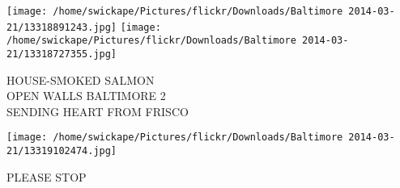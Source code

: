 \documentclass[10pt,letterpaper]{article}
\begin{document}
\vspace{0.25in}
\texttt{[image: /home/swickape/Pictures/flickr/Downloads/Baltimore 2014-03-21/13318891243.jpg]}
\texttt{[image: /home/swickape/Pictures/flickr/Downloads/Baltimore 2014-03-21/13318727355.jpg]}

HOUSE{-}SMOKED SALMON\\
OPEN WALLS BALTIMORE 2\\
SENDING HEART FROM FRISCO\\
\pagebreak

\texttt{[image: /home/swickape/Pictures/flickr/Downloads/Baltimore 2014-03-21/13319102474.jpg]}

PLEASE STOP\\
\pagebreak
\end{document}
